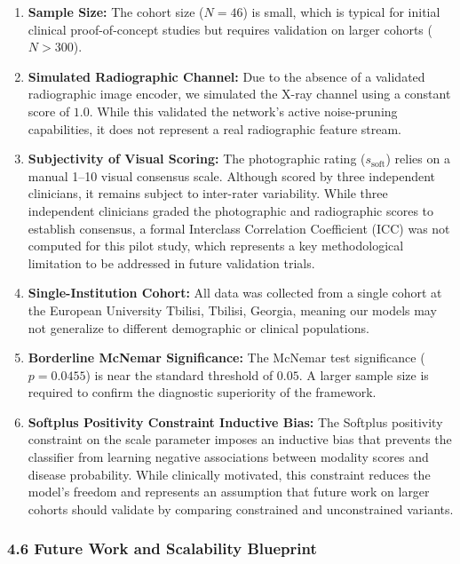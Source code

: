\documentclass[
]{article}
\begin{document}
\begin{enumerate}
\def\labelenumi{\arabic{enumi}.}
\item
  \textbf{Sample Size:} The cohort size (\(N = 46\)) is small, which is
  typical for initial clinical proof-of-concept studies but requires
  validation on larger cohorts (\(N > 300\)).
\item
  \textbf{Simulated Radiographic Channel:} Due to the absence of a
  validated radiographic image encoder, we simulated the X-ray channel
  using a constant score of \(1.0\). While this validated the network's
  active noise-pruning capabilities, it does not represent a real
  radiographic feature stream.
\item
  \textbf{Subjectivity of Visual Scoring:} The photographic rating
  (\(s_{\text{soft}}\)) relies on a manual 1--10 visual consensus scale.
  Although scored by three independent clinicians, it remains subject to
  inter-rater variability. While three independent clinicians graded the
  photographic and radiographic scores to establish consensus, a formal
  Interclass Correlation Coefficient (ICC) was not computed for this
  pilot study, which represents a key methodological limitation to be
  addressed in future validation trials.
\item
  \textbf{Single-Institution Cohort:} All data was collected from a
  single cohort at the European University Tbilisi, Tbilisi, Georgia,
  meaning our models may not generalize to different demographic or
  clinical populations.
\item
  \textbf{Borderline McNemar Significance:} The McNemar test
  significance (\(p = 0.0455\)) is near the standard threshold of
  \(0.05\). A larger sample size is required to confirm the diagnostic
  superiority of the framework.
\item
  \textbf{Softplus Positivity Constraint Inductive Bias:} The Softplus
  positivity constraint on the scale parameter imposes an inductive bias
  that prevents the classifier from learning negative associations
  between modality scores and disease probability. While clinically
  motivated, this constraint reduces the model's freedom and represents
  an assumption that future work on larger cohorts should validate by
  comparing constrained and unconstrained variants.
\end{enumerate}

\subsubsection{\texorpdfstring{\textbf{4.6 Future Work and Scalability
Blueprint}}{4.6 Future Work and Scalability Blueprint}}\label{future-work-and-scalability-blueprint}
\end{document}
